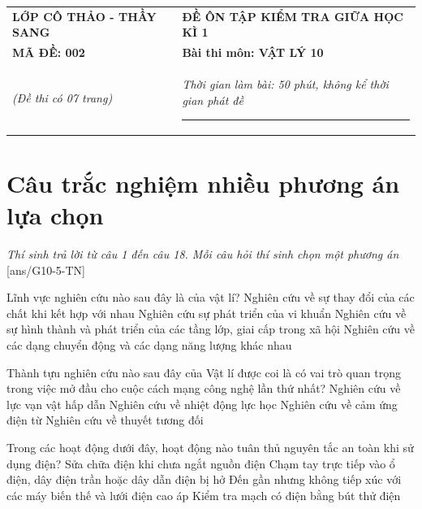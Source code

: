 \begin{tabular}{M{6.5cm}M{11cm}}
	\textbf{LỚP CÔ THẢO - THẦY SANG}& \textbf{ĐỀ ÔN TẬP KIỂM TRA GIỮA HỌC KÌ 1}\\
	\textbf{MÃ ĐỀ: 002}& \textbf{Bài thi môn: VẬT LÝ 10}\\
	\textit{(Đề thi có 07 trang)}& \textit{Thời gian làm bài: 50 phút, không kể thời gian phát đề}
	
	\noindent\rule{4cm}{0.8pt} \\
\end{tabular}
\setcounter{section}{0}
\section{Câu trắc nghiệm nhiều phương án lựa chọn}
\textit{Thí sinh trả lời từ câu 1 đến câu 18. Mỗi câu hỏi thí sinh chọn một phương án}
\setcounter{ex}{0}
[ans/G10-5-TN]
\begin{ex}
	Lĩnh vực nghiên cứu nào sau đây là của vật lí?	
	\choice
	{Nghiên cứu về sự thay đổi của các chất khi kết hợp với nhau}
	{Nghiên cứu sự phát triển của vi khuẩn}
	{Nghiên cứu về sự hình thành và phát triển của các tầng lớp, giai cấp trong xã hội}
	{\True Nghiên cứu về các dạng chuyển động và các dạng năng lượng khác nhau}
	\loigiai{}
\end{ex}
\begin{ex}
	Thành tựu nghiên cứu nào sau đây của Vật lí được coi là có vai trò quan trọng trong việc mở đầu cho cuộc cách mạng công nghệ lần thứ nhất?
	\choice
	{Nghiên cứu về lực vạn vật hấp dẫn}
	{\True Nghiên cứu về nhiệt động lực học}
	{Nghiên cứu về cảm ứng điện từ}
	{Nghiên cứu về thuyết tương đối}
	\loigiai{}
\end{ex}
\begin{ex}
	Trong các hoạt động dưới đây, hoạt động nào tuân thủ nguyên tắc an toàn khi sử dụng điện?
	\choice
	{Sửa chữa điện khi chưa ngắt nguồn điện}
	{Chạm tay trực tiếp vào ổ điện, dây điện trần hoặc dây dẫn điện bị hở}
	{Đến gần nhưng không tiếp xúc với các máy biến thế và lưới điện cao áp}
	{\True Kiểm tra mạch có điện bằng bút thử điện}
	\loigiai{}
\end{ex}
